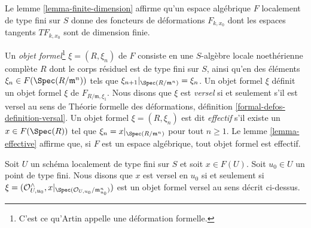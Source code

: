 \medskip\noindent
Le lemme \ref{lemma-finite-dimension} affirme qu'un espace algébrique $F$
localement de type fini sur $S$ donne des foncteurs de déformations
$F_{k, x_0}$ dont les espaces tangents $TF_{k, x_0}$ sont de dimension finie.

\medskip\noindent
Un {\it objet formel}\footnote{C'est ce qu'Artin appelle une déformation
formelle.} $\xi = (R, \xi_n)$ de $F$ consiste en une $S$-algèbre locale
noethérienne complète $R$ dont le corps résiduel est de type fini sur $S$,
ainsi qu'en des éléments $\xi_n \in F(\Spec(R/\mathfrak m^n))$ tels que
$\xi_{n + 1}|_{\Spec(R/\mathfrak m^n)} = \xi_n$. Un objet formel $\xi$
définit un objet formel $\xi$ de $F_{R/\mathfrak m, \xi_1}$. Nous disons que
$\xi$ est {\it versel} si et seulement s'il est versel au sens de Théorie
formelle des déformations, définition \ref{formal-defos-definition-versal}.
Un objet formel $\xi = (R, \xi_n)$ est dit {\it effectif} s'il existe un
$x \in F(\Spec(R))$ tel que $\xi_n = x|_{\Spec(R/\mathfrak m^n)}$ pour tout
$n \geq 1$. Le lemme \ref{lemma-effective} affirme que, si $F$ est un espace
algébrique, tout objet formel est effectif.

\medskip\noindent
Soit $U$ un schéma localement de type fini sur $S$ et soit $x \in F(U)$.
Soit $u_0 \in U$ un point de type fini. Nous disons que $x$ est versel en
$u_0$ si et seulement si
$\xi = (\mathcal{O}_{U, u_0}^\wedge,
x|_{\Spec(\mathcal{O}_{U, u_0}/\mathfrak m_{u_0}^n)})$
est un objet formel versel au sens décrit ci-dessus.

